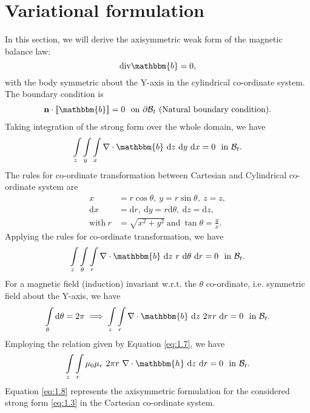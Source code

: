 \section{Variational formulation}
In this section, we will derive the axisymmetric weak form of the magnetic balance law:
\begin{equation}
 \text{div}\mathbbm{b} = 0,
 \end{equation} 
with the body symmetric about the Y-axis in the cylindrical co-ordinate system. The boundary condition is
\begin{align}
\mathbf{n} \cdot \llbracket \mathbbm{b} \rrbracket = 0 \ \ \text{on} \ \partial\mathcal{B}_t \ (\text{Natural boundary condition}).
\label{eq:1.10}
\end{align}
Taking integration of the strong form over the whole domain, we have 
\begin{equation}
\int\limits_{z} \int\limits_{y} \int\limits_{x} \nabla \cdot \mathbbm{b} \ \mathrm{d}z \ \mathrm{d}y \ \mathrm{d}x = 0 \ \ \text{in} \ \mathcal{B}_t. 
\end{equation}
The rules for co-ordinate transformation between Cartesian and Cylindrical co-ordinate system are
\begin{align}
x &= r \cos \theta, \ y = r \sin \theta, \ z = z, \nonumber\\
\mathrm{d}x &= \mathrm{d}r, \ \mathrm{d}y = r \mathrm{d}\theta, \ \mathrm{d}z = \mathrm{d}z, \nonumber\\
\text{with} \ r &= \sqrt{x^2 + y^2} \ \text{and} \ \tan \theta = \frac{y}{x}.
\end{align}
Applying the rules for co-ordinate transformation, we have
\begin{equation}
\int\limits_{z} \int\limits_{\theta} \int\limits_{r} \nabla \cdot \mathbbm{b} \ \mathrm{d}z \ r \ \mathrm{d}\theta \ \mathrm{d}r = 0 \ \ \text{in} \ \mathcal{B}_t.
\end{equation}
For a magnetic field (induction) invariant w.r.t. the $\theta$ co-ordinate, i.e. symmetric field about the Y-axis, we have
\begin{align}
\int\limits_{\theta} \mathrm{d}\theta = 2 \pi \implies \int\limits_{z} \int\limits_{r} \nabla \cdot \mathbbm{b} \ \mathrm{d}z \ 2 \pi r \ \mathrm{d}r = 0 \ \ \text{in} \ \mathcal{B}_t.
\label{eq:1.6}
\end{align}
Employing the relation given by Equation \eqref{eq:1.7}, we have
\begin{equation}
\int\limits_{z} \int\limits_{r} \mu_0 \mu_r \ 2 \pi r \ \nabla \cdot \mathbbm{h} \ \mathrm{d}z \ \mathrm{d}r = 0 \ \ \text{in} \ \mathcal{B}_t.
\label{eq:1.8}
\end{equation}
Equation \eqref{eq:1.8} represents the axisymmetric formulation for the considered strong form \eqref{eq:1.3} in the Cartesian co-ordinate system. \par 

